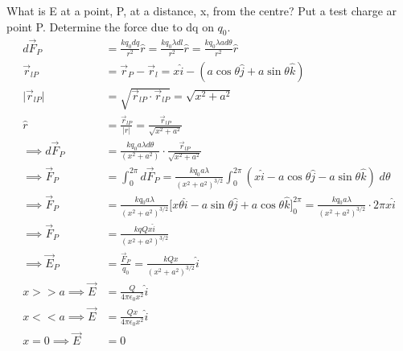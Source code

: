 \documentclass[a4paper, 11pt, normalem]{report}
\begin{document}
What is E at a point, P, at a distance, x, from the centre?
Put a test charge ar point P. 
Determine the force due to dq on $q_{0}$.
\begin{align}
    d\vec{F}_{P} &= \frac{kq_{0}dq}{r^{2}} \hat{r} = \frac{kq_{0}\lambda dl}{r^{2}} \hat{r} = \frac{kq_{0}\lambda a d\theta}{r^{2}} \hat{r} \\
    \vec{r}_{lP} &= \vec{r}_{P} - \vec{r}_{l} = x \hat{i} - (a\cos\theta \hat{j} + a\sin\theta \hat{k}) \\
    \big|\vec{r}_{lP}\big| &= \sqrt{\vec{r}_{lP} \cdot \vec{r}_{lP}} = \sqrt{x^{2} + a^{2}} \\
    \hat{r} &= \frac{\vec{r}_{lP}}{|r|} = \frac{\vec{r}_{lP}}{\sqrt{x^{2} + a^{2}}} \\
    \implies d\vec{F}_{P} &= \frac{k q_{0} a \lambda d\theta}{(x^{2} + a^{2})} \cdot \frac{\vec{r}_{lP}}{\sqrt{x^{2} + a^{2}}} \\
    \implies \vec{F}_{P} &= \int_{0}^{2\pi} d\vec{F}_{P} = \frac{k q_{0} a \lambda}{(x^{2} + a^{2})^{3/2}} \int_{0}^{2\pi} (x \hat{i} - a\cos\theta \hat{j} - a\sin\theta \hat{k}) \; d\theta \\
    \implies \vec{F}_{P} &= \frac{k q_{0} a \lambda}{(x^{2} + a^{2})^{3/2}} \big[x\theta \hat{i} - a\sin\theta \hat{j} + a\cos\theta \hat{k} \big]_{0}^{2\pi} = \frac{k q_{0} a \lambda}{(x^{2} + a^{2})^{3/2}} \cdot 2\pi x \hat{i} \\
    \implies \vec{F}_{P} &= \frac{k q Q x \hat{i}}{(x^{2} + a^{2})^{3/2}} \\
    \implies \vec{E}_{P} &= \frac{\vec{F}_{P}}{q_{0}} = \frac{k Q x}{(x^{2} + a^{2})^{3/2}} \hat{i} \\
    x >> a \implies \vec{E} &= \frac{Q}{4\pi\epsilon_{0}x^{2}} \hat{i} \\
    x << a \implies \vec{E} &= \frac{Q x}{4\pi\epsilon_{0}x^{2}} \hat{i} \\
    x = 0 \implies \vec{E} &= 0
\end{align}

\chapter{}
\end{document}
